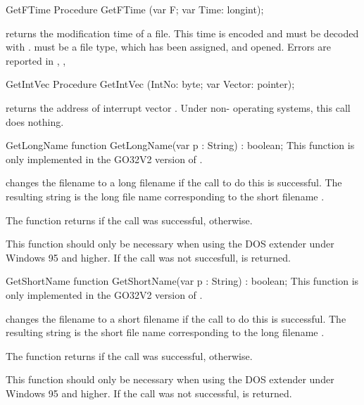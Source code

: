 
\begin{procedure}{GetFTime}
\Declaration
Procedure GetFTime (var F; var Time: longint);
\Description

 returns the modification time of a file.
This time is encoded and must be decoded with . 
 must be a file type, which has been assigned, and
opened.
\Errors
Errors are reported in 
\SeeAlso
{}, ,
\end{procedure}


\begin{procedure}{GetIntVec}
\Declaration
Procedure GetIntVec (IntNo: byte; var Vector: pointer);
\Description

 returns the address of interrupt vector
.
\Errors
Under non- \dos operating systems, this call does nothing.
\SeeAlso
{}
\end{procedure}

\begin{function}{GetLongName}
\Declaration
function GetLongName(var p : String) : boolean;\Description
This function is only implemented in the GO32V2 version of \fpc.

 changes the filename  to a long filename
if the \dos call to do this is successful. The resulting string
is the long  file name corresponding to the short filename .

The function returns  if the \dos call was successful, 
 otherwise.

This function should only be necessary when using the DOS extender
under Windows 95 and higher.
\Errors
If the \dos call was not succesfull,  is returned.
\SeeAlso
{}
\end{function}

\begin{function}{GetShortName}
\Declaration
function GetShortName(var p : String) : boolean;\Description
This function is only implemented in the GO32V2 version of \fpc.

 changes the filename  to a short filename
if the \dos call to do this is successful. The resulting string
is the short file name corresponding to the long filename .

The function returns  if the \dos call was successful, 
 otherwise.

This function should only be necessary when using the DOS extender
under Windows 95 and higher.
\Errors
If the \dos call was not successful,  is returned.
\SeeAlso
{}
\end{function}

